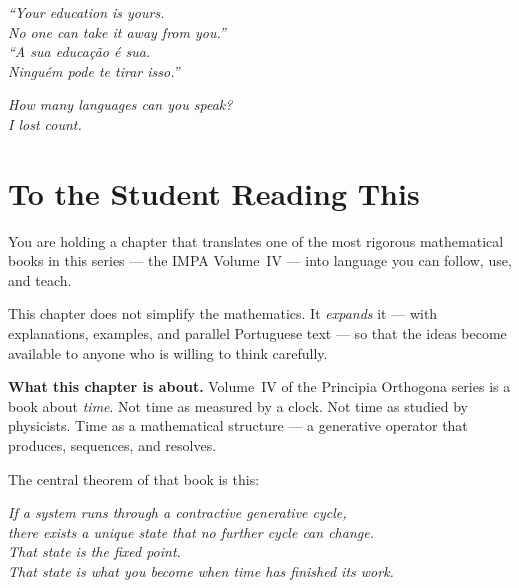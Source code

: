 \documentclass[12pt, openright]{book}
\newcommand{\bilingualq}[2]{%
  \begin{center}
  \begin{minipage}{0.85\textwidth}
  \small\color{beastblue}\itshape #1\\[0.3em]
  \color{gray}\itshape #2
  \end{minipage}
  \end{center}
}
\theoremstyle{definition}
\theoremstyle{remark}
\begin{document}
\vspace{1.5cm}

\bilingualq{%
``Your education is yours.\\
No one can take it away from you.''
}{%
``A sua educação é sua.\\
Ninguém pode te tirar isso.''}

\vspace{1.5cm}
\begin{center}
{\small\color{gray}\itshape
How many languages can you speak?\\
I lost count.}
\end{center}

\clearpage
\tableofcontents
\clearpage

\mainmatter

\chapter*{To the Student Reading This}

You are holding a chapter that translates one of the most
rigorous mathematical books in this series --- the IMPA
Volume~IV --- into language you can follow, use, and teach.

This chapter does not simplify the mathematics.
It \textit{expands} it --- with explanations, examples, and
parallel Portuguese text --- so that the ideas become available
to anyone who is willing to think carefully.

\medskip

\textbf{What this chapter is about.}
Volume~IV of the Principia Orthogona series is a book about
\textit{time}. Not time as measured by a clock. Not time as
studied by physicists. Time as a mathematical structure ---
a generative operator that produces, sequences, and resolves.

The central theorem of that book is this:

\begin{center}
\large\color{beastblue}\itshape
If a system runs through a contractive generative cycle,\\
there exists a unique state that no further cycle can change.\\
That state is the fixed point.\\
That state is what you become when time has finished its work.
\end{center}
\end{document}

